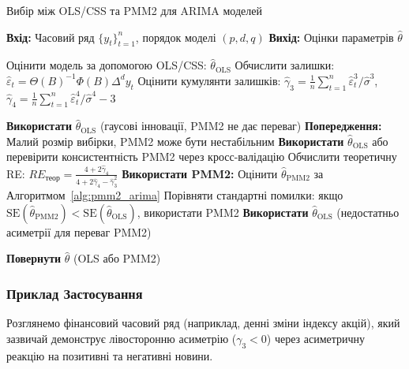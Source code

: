 \documentclass[12pt,a4paper]{article}
\begin{document}
	\begin{algorithm}[H]
		\caption{Вибір між OLS/CSS та PMM2 для ARIMA моделей}
		\label{alg:method_selection}
		\begin{algorithmic}[1]
			\STATE \textbf{Вхід:} Часовий ряд $\{y_t\}_{t=1}^n$, порядок моделі $(p, d, q)$
			\STATE \textbf{Вихід:} Оцінки параметрів $\hat{\theta}$
			
			\STATE Оцінити модель за допомогою OLS/CSS: $\hat{\theta}_{\text{OLS}}$
			\STATE Обчислити залишки: $\hat{\varepsilon}_t = \Theta(B)^{-1} \Phi(B) \Delta^d y_t$
			\STATE Оцінити кумулянти залишків: $\hat{\gamma}_3 = \frac{1}{n} \sum_{t=1}^n \hat{\varepsilon}_t^3 / \hat{\sigma}^3$, $\hat{\gamma}_4 = \frac{1}{n} \sum_{t=1}^n \hat{\varepsilon}_t^4 / \hat{\sigma}^4 - 3$
			
			\STATE \textbf{Використати} $\hat{\theta}_{\text{OLS}}$ (гаусові інновації, PMM2 не дає переваг)
			\STATE \textbf{Попередження:} Малий розмір вибірки, PMM2 може бути нестабільним
			\STATE \textbf{Використати} $\hat{\theta}_{\text{OLS}}$ або перевірити консистентність PMM2 через кросс-валідацію
			\ELSE
			\STATE Обчислити теоретичну RE: $RE_{\text{теор}} = \frac{4 + 2\hat{\gamma}_4}{4 + 2\hat{\gamma}_4 - \hat{\gamma}_3^2}$
			\STATE \textbf{Використати PMM2:} Оцінити $\hat{\theta}_{\text{PMM2}}$ за Алгоритмом~\ref{alg:pmm2_arima}
			\STATE Порівняти стандартні помилки: якщо $\text{SE}(\hat{\theta}_{\text{PMM2}}) < \text{SE}(\hat{\theta}_{\text{OLS}})$, використати PMM2
			\ELSE
			\STATE \textbf{Використати} $\hat{\theta}_{\text{OLS}}$ (недостатньо асиметрії для переваг PMM2)
			\ENDIF
			\ENDIF
			
			\STATE \textbf{Повернути} $\hat{\theta}$ (OLS або PMM2)
		\end{algorithmic}
	\end{algorithm}
	
	\subsubsection{Приклад Застосування}
	
	Розглянемо фінансовий часовий ряд (наприклад, денні зміни індексу акцій), який зазвичай демонструє лівосторонню асиметрію ($\gamma_3 < 0$) через асиметричну реакцію на позитивні та негативні новини.
	
\end{document}
